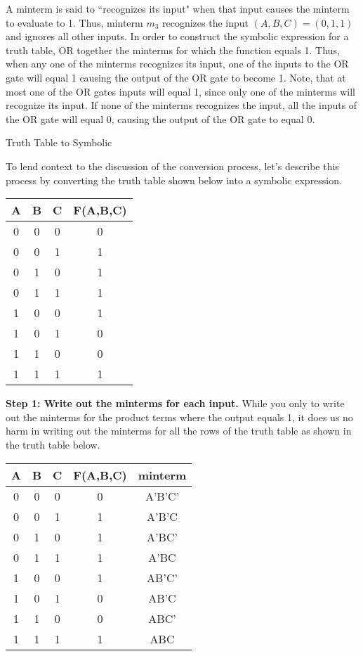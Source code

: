 A minterm is said to ``recognizes its input" when that input
causes the minterm to evaluate to 1.  Thus, minterm $m_3$ recognizes
the input $(A,B,C)=(0,1,1)$ and ignores all other inputs.  In order 
to construct the symbolic expression for a truth table, OR together 
the minterms for which the function equals 1. Thus, when any one of 
the minterms recognizes its input, one of the inputs to the OR gate 
will equal 1 causing the output of the OR gate to become 1.  Note, 
that at most one of the OR gates inputs will equal 1, since only one 
of the minterms will recognize its input.  If none of the minterms 
recognizes the input, all the inputs of the OR gate will equal 0, 
causing the output of the OR gate to equal 0.  

\begin{process}{Truth Table to Symbolic}
\label{process:representationTTtoSymbolic}

To lend context to the discussion of the conversion process, let's describe this
process by converting the truth table shown below into a symbolic expression.

\begin{tabular}{c|c|c||c}
A & B & C & F(A,B,C)		\\ \hline
0 & 0 & 0 & 0		\\ \hline
0 & 0 & 1 & 1		\\ \hline
0 & 1 & 0 & 1		\\ \hline
0 & 1 & 1 & 1		\\ \hline
1 & 0 & 0 & 1		\\ \hline
1 & 0 & 1 & 0		\\ \hline
1 & 1 & 0 & 0		\\ \hline
1 & 1 & 1 & 1		\\ 
\end{tabular}

\textbf{Step 1: Write out the minterms for each input.}
While you only  to write out the minterms for the product
terms where the output equals 1, it does us no harm in writing out the minterms
for all the rows of the truth table as shown in the truth table below.

\begin{tabular}{c|c|c||c|c}
A & B & C & F(A,B,C)	& minterm	\\ \hline
0 & 0 & 0 & 0		& A'B'C'  	\\ \hline
0 & 0 & 1 & 1		& A'B'C		\\ \hline
0 & 1 & 0 & 1		& A'BC'   	\\ \hline
0 & 1 & 1 & 1		& A'BC   	\\ \hline
1 & 0 & 0 & 1		& AB'C'  	\\ \hline
1 & 0 & 1 & 0		& AB'C  		\\ \hline
1 & 1 & 0 & 0		& ABC'		\\ \hline
1 & 1 & 1 & 1		& ABC  		\\ 
\end{tabular}
\vspace{0.2mm}


\end{process}
